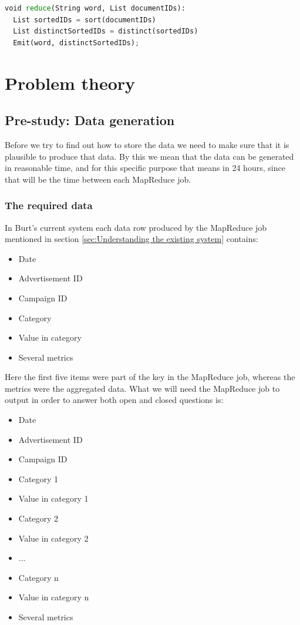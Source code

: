 \begin{lstlisting}[language=Python,caption={An example reduce function, in pseudo-code.},captionpos=b, label={MapReduceReduce}]
 void reduce(String word, List documentIDs):
  List sortedIDs = sort(documentIDs)
  List distinctSortedIDs = distinct(sortedIDs)
  Emit(word, distinctSortedIDs);
\end{lstlisting}

\pagebreak

\chapter{Problem theory}

\section{Pre-study: Data generation}
Before we try to find out how to store the data we need to make sure that it is plausible to produce that data. By this we mean that the data can be generated in reasonable time, and for this specific purpose that means in 24 hours, since that will be the time between each MapReduce job.

\subsection{The required data}
In Burt's current system each data row produced by the MapReduce job mentioned in section \ref{sec:Understanding the existing system} contains:
\begin{itemize}
\item Date
\item Advertisement ID
\item Campaign ID
\item Category
\item Value in category
\item Several metrics
\end{itemize}

Here the first five items were part of the key in the MapReduce job, whereas the metrics were the aggregated data. What we will need the MapReduce job to output in order to answer both open and closed questions is:

\begin{itemize}
\item Date
\item Advertisement ID
\item Campaign ID
\item Category 1
\item Value in category 1
\item Category 2
\item Value in category 2
\item ...
\item Category n
\item Value in category n
\item Several metrics
\end{itemize}

